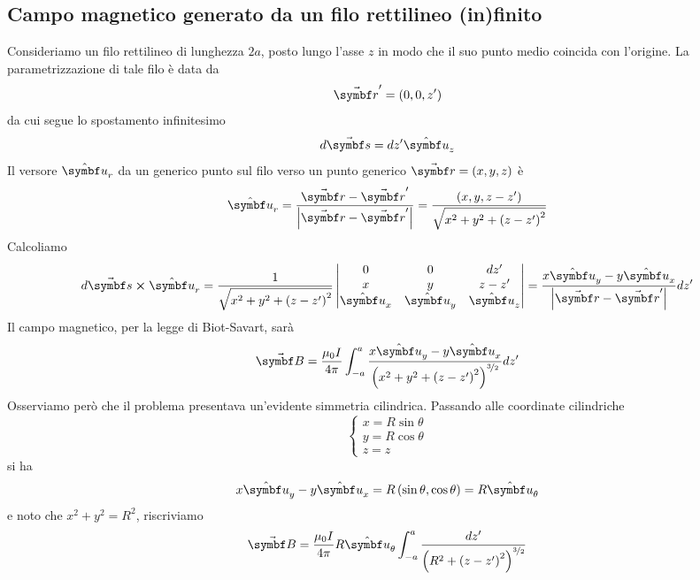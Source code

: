 \subsection{Campo magnetico generato da un filo rettilineo (in)finito}
Consideriamo un filo rettilineo di lunghezza $2a$, posto lungo l'asse $z$ in modo che il suo punto medio coincida con l'origine. La parametrizzazione di tale filo è data da
\begin{equation*}
	\vba{r}'=\left(0,0,z'\right)
\end{equation*}
da cui segue lo spostamento infinitesimo
\begin{equation*}
	d\vba{s}=dz'\vbh{u}_z
\end{equation*}
Il versore $\vbh{u}_r$ da un generico punto sul filo verso un punto generico $\vba{r}=(x,y,z)$ è
\begin{equation*}
	\vbh{u}_r=\frac{\vba{r}-\vba{r}'}{\abs{\vba{r}-\vba{r}'}}=\frac{\left(x,y,z-z'\right)}{\sqrt{x^2+y^2+\left(z-z'\right)^2}}
\end{equation*}
Calcoliamo
\begin{equation*}
	d\vba{s}\cross\vbh{u}_r=\frac{1}{\sqrt{x^2+y^2+\left(z-z'\right)^2}}
	\begin{vmatrix}
		0 & 0 & dz'\\
		x & y & z-z'\\
		\vbh{u}_x & \vbh{u}_y & \vbh{u}_z 
	\end{vmatrix}
	=\frac{x\vbh{u}_y-y\vbh{u}_x}{\abs{\vba{r}-\vba{r}'}}dz'
\end{equation*}
Il campo magnetico, per la legge di Biot-Savart, sarà
\begin{equation*}
	\vba{B}=\frac{\mu_0 I}{4\pi}\int_{-a}^{a} \frac{x\vbh{u}_y-y\vbh{u}_x}{\left(x^2+y^2+\left(z-z'\right)^2\right)^{\nicefrac{3}{2}}}dz'
\end{equation*}
Osserviamo però che il problema presentava un'evidente simmetria cilindrica. Passando alle coordinate cilindriche
\begin{equation*}
	\begin{cases}
		x=R\sin\theta\\
		y=R\cos\theta\\
		z=z
	\end{cases}
\end{equation*}
si ha
\begin{equation*}
	x\vbh{u}_y-y\vbh{u}_x=R\left(\sin\theta,\cos\theta\right)=R\vbh{u}_{\theta}
\end{equation*}
e noto che $x^2+y^2=R^2$, riscriviamo
\begin{equation*}
	\vba{B}=\frac{\mu_0 I}{4\pi}R\vbh{u}_{\theta}\int_{-a}^{a}\frac{dz'}{\left(R^2+\left(z-z'\right)^2\right)^{\nicefrac{3}{2}}}
\end{equation*}
